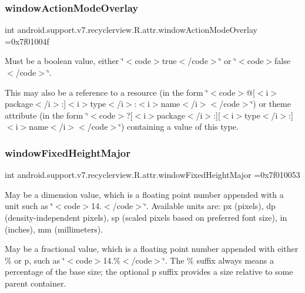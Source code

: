 \subsubsection{\texorpdfstring{window\+Action\+Mode\+Overlay}{windowActionModeOverlay}}
{\footnotesize\ttfamily int android.\+support.\+v7.\+recyclerview.\+R.\+attr.\+window\+Action\+Mode\+Overlay =0x7f01004f\hspace{0.3cm}{\ttfamily [static]}}

Must be a boolean value, either \char`\"{}$<$code$>$true$<$/code$>$\char`\"{} or \char`\"{}$<$code$>$false$<$/code$>$\char`\"{}. 

This may also be a reference to a resource (in the form \char`\"{}$<$code$>$@\mbox{[}$<$i$>$package$<$/i$>$\+:\mbox{]}$<$i$>$type$<$/i$>$\+:$<$i$>$name$<$/i$>$$<$/code$>$\char`\"{}) or theme attribute (in the form \char`\"{}$<$code$>$?\mbox{[}$<$i$>$package$<$/i$>$\+:\mbox{]}\mbox{[}$<$i$>$type$<$/i$>$\+:\mbox{]}$<$i$>$name$<$/i$>$$<$/code$>$\char`\"{}) containing a value of this type. \mbox{\label{classandroid_1_1support_1_1v7_1_1recyclerview_1_1R_1_1attr_a23b8af4efc3f70221f19629b04a8ce69}} 
\subsubsection{\texorpdfstring{window\+Fixed\+Height\+Major}{windowFixedHeightMajor}}
{\footnotesize\ttfamily int android.\+support.\+v7.\+recyclerview.\+R.\+attr.\+window\+Fixed\+Height\+Major =0x7f010053\hspace{0.3cm}{\ttfamily [static]}}

May be a dimension value, which is a floating point number appended with a unit such as \char`\"{}$<$code$>$14.\+5sp$<$/code$>$\char`\"{}. Available units are\+: px (pixels), dp (density-\/independent pixels), sp (scaled pixels based on preferred font size), in (inches), mm (millimeters). 

May be a fractional value, which is a floating point number appended with either \% or p, such as \char`\"{}$<$code$>$14.\%$<$/code$>$\char`\"{}. The \% suffix always means a percentage of the base size; the optional p suffix provides a size relative to some parent container. 

